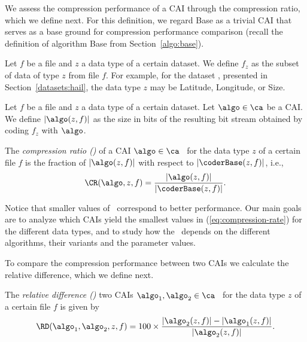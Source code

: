 We assess the compression performance of a CAI through the compression ratio, which we define next. For this definition, we regard Base as a trivial CAI that serves as a base ground for compression performance comparison (recall the definition of algorithm Base from Section~\ref{algo:base}).


\vspace{+5pt}
\begin{defcion}
Let $f$ be a file and $z$ a data type of a certain dataset. We define $f_z$ as the subset of data of type $z$ from file $f$. For example, for the dataset \datasethail, presented in Section~\ref{datasets:hail}, the data type $z$ may be Latitude, Longitude, or Size.
\end{defcion}


\vspace{+2pt}
\begin{defcion}
\label{eq:coding-size}
Let $f$ be a file and $z$ a data type of a certain dataset. Let $\algo \in \ca$ be a CAI. We define $|\algo(z, f)|$ as the size in bits of the resulting bit stream obtained by coding $f_z$ with $\algo$.
\end{defcion}


\vspace{+2pt}
\begin{defcion}
\label{def:compression-rate}
The \textit{compression ratio (\CRit)} of a CAI $\algo \in \ca$ \ for the data type $z$ of a certain file $f$ is the fraction of $|\algo(z, f)|$ with respect to $|\coderBase(z, f)|$, i.e.,
\vspace{-5pt}
\begin{equation}
\label{eq:compression-rate}
\CR(\algo, z, f) = \frac{|\algo(z, f)|}{|\coderBase(z, f)|}.
\end{equation}
\end{defcion}


Notice that smaller values of \CR\ correspond to better performance. Our main goals are to analyze which CAIs yield the smallest values in (\ref{eq:compression-rate}) for the different data types, and to study how the \CR\ depends on the different algorithms, their variants and the parameter values.


\clearpage


To compare the compression performance between two CAIs we calculate the relative difference, which we define next.


\vspace{+5pt}
\begin{defcion}
\label{relative-difference}
The \textit{relative difference (\RDit)} two CAIs $\algo_1, \algo_2 \in {\ca}$ \ for the data type $z$ of a certain file $f$ is given by
\vspace{-5pt}
\begin{equation}
\label{eq:relative-difference}
\RD(\algo_1, \algo_2, z, f)  =
100\times\frac{|\algo_2 (z, f)| - |\algo_1 (z, f)|}{ |\algo_2 (z, f)| }.
\end{equation}
\end{defcion}


